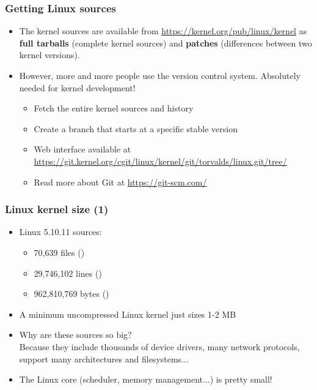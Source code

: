 \begin{frame}
  \frametitle{Getting Linux sources}
  \begin{itemize}
  \item The kernel sources are available from
    \url{https://kernel.org/pub/linux/kernel} as {\bf full tarballs}
    (complete kernel sources) and {\bf patches} (differences between
    two kernel versions).
  \item However, more and more people use the  version
    control system. Absolutely needed for kernel development!
    \begin{itemize}
    \item Fetch the entire kernel sources and history\\
      {\footnotesize
      }
    \item Create a branch that starts at a specific stable version\\
    \item Web interface available at
      \url{https://git.kernel.org/cgit/linux/kernel/git/torvalds/linux.git/tree/}
    \item Read more about Git at \url{https://git-scm.com/}
    \end{itemize}
  \end{itemize}
\end{frame}

\begin{frame}
  \frametitle{Linux kernel size (1)}
  \begin{itemize}
  \item Linux 5.10.11 sources:\\
    \begin{itemize}
	\item 70,639 files ()
	\item 29,746,102 lines ()
	\item 962,810,769 bytes ()
    \end{itemize}
  \item A minimum uncompressed Linux kernel just sizes 1-2 MB
  \item Why are these sources so big?\\
    Because they include thousands of device drivers, many network
    protocols, support many architectures and filesystems...
  \item The Linux core (scheduler, memory management...) is pretty
    small!
  \end{itemize}
\end{frame}

